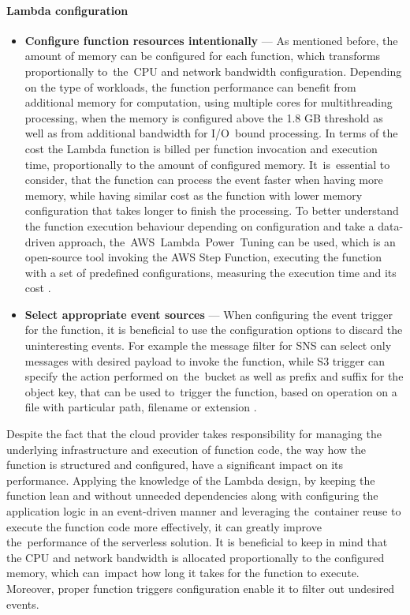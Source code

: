 \paragraph{Lambda configuration}

\begin{itemize}
   \item \textbf{Configure function resources intentionally} --- As mentioned before, the amount of memory can be configured for each function, which transforms proportionally to~the~CPU and network bandwidth configuration.
   Depending on the type of workloads, the function performance can benefit from additional memory for computation, using multiple cores for multithreading processing, when the memory is configured above the 1.8 GB threshold as well as from additional bandwidth for I/O~bound processing.
   In terms of the cost the Lambda function is billed per function invocation and execution time, proportionally to the amount of configured memory.
   It~is~essential to consider, that the function can process the event faster when having more memory, while having similar cost as the function with lower memory configuration that takes longer to finish the processing.
   To better understand the function execution behaviour depending on configuration and take a data-driven approach, the~AWS~Lambda~Power~Tuning can be used, which is an open-source tool invoking the AWS Step Function, executing the function with a set of predefined configurations, measuring the execution time and its cost \cite{BecomeAServerlessBlackBelt}.
   \item \textbf{Select appropriate event sources} --- When configuring the event trigger for the function, it is beneficial to use the configuration options to discard the uninteresting events. For example the message filter for SNS can select only messages with desired payload to invoke the function, while S3 trigger can specify the action performed on~the~bucket as well as prefix and suffix for the object key, that can be used to~trigger the function, based on operation on a file with particular path, filename or extension \cite{BecomeAServerlessBlackBelt}.
\end{itemize}

Despite the fact that the cloud provider takes responsibility for managing the underlying infrastructure and execution of function code, the way how the function is structured and configured, have a significant impact on its performance.
Applying the knowledge of the Lambda design, by keeping the function lean and without unneeded dependencies along with configuring the application logic in an event-driven manner and leveraging the~container reuse to execute the function code more effectively, it can greatly improve the~performance of the serverless solution.
It is beneficial to keep in mind that the CPU and network bandwidth is allocated proportionally to the configured memory, which can~impact how long it takes for the function to execute.
Moreover, proper function triggers configuration enable it to filter out undesired events.


